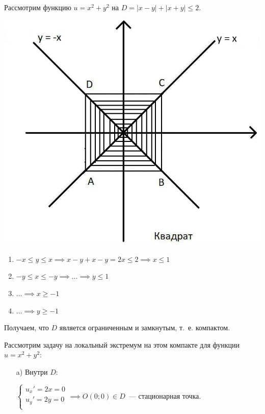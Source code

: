 \documentclass[../../main.tex]{subfiles}
\begin{document}
	\begin{exmp}
		Рассмотрим функцию $u = x^2 + y^2$ на
		$D = |x - y| + |x + y| \leq 2$.
		\begin{center}
			\includegraphics[scale = 0.7]{square.jpg}
		\end{center}
		
		\begin{enumerate}
		 \item $-x \le y \le x \implies x-y+x-y = 2x \le 2 \implies x \le 1$
         \item $-y \le x \le -y \implies \dots \implies y \le 1$
         \item $ \dots \implies x \ge -1$
         \item $ \dots \implies y \ge -1$
		\end{enumerate}
		
		Получаем, что $D$ является ограниченным и замкнутым, т.~е. компактом.
		
		Рассмотрим задачу на локальный экстремум на этом 
		компакте для функции $u = x^2 + y^2$:
		\begin{enumerate}
			\item[a)] Внутри $D$:
			
			$\begin{cases}
				u_{x}' = 2x = 0\\
				u_{y}' = 2y = 0\\
			\end{cases} \implies O(0; 0) \in D$~--- стационарная точка.
			

\end{enumerate}
\end{exmp}
\end{document}
